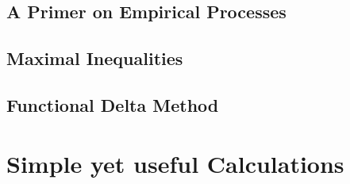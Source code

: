 \documentclass[12pt]{scrreport}
\theoremstyle{remark}
\theoremstyle{plain}
\begin{document}
\section{A Primer on Empirical Processes}


\section{Maximal Inequalities}


\section{Functional Delta Method}


\chapter{Simple yet useful Calculations} 



\printnomenclature

{}

\end{document}

